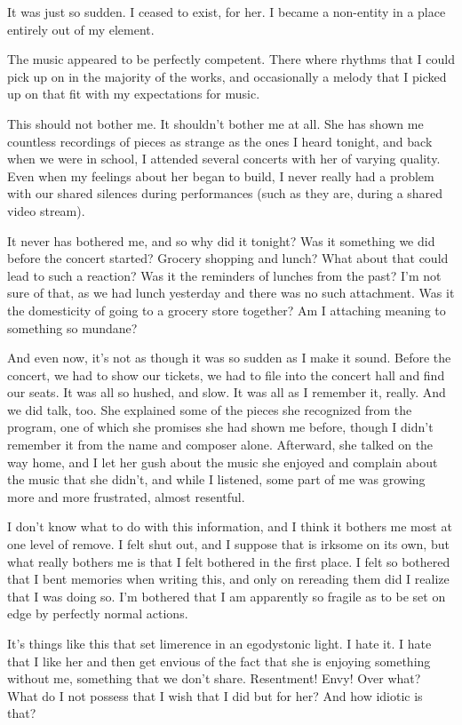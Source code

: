 It was just so sudden. I ceased to exist, for her. I became a non-entity in a place entirely out of my element.

The music appeared to be perfectly competent. There where rhythms that I could pick up on in the majority of the works, and occasionally a melody that I picked up on that fit with my expectations for music.

This should not bother me. It shouldn't bother me at all. She has shown me countless recordings of pieces as strange as the ones I heard tonight, and back when we were in school, I attended several concerts with her of varying quality. Even when my feelings about her began to build, I never really had a problem with our shared silences during performances (such as they are, during a shared video stream).

It never has bothered me, and so why did it tonight? Was it something we did before the concert started? Grocery shopping and lunch? What about that could lead to such a reaction? Was it the reminders of lunches from the past? I'm not sure of that, as we had lunch yesterday and there was no such attachment. Was it the domesticity of going to a grocery store together? Am I attaching meaning to something so mundane?

And even now, it's not as though it was so sudden as I make it sound. Before the concert, we had to show our tickets, we had to file into the concert hall and find our seats. It was all so hushed, and slow. It was all as I remember it, really. And we did talk, too. She explained some of the pieces she recognized from the program, one of which she promises she had shown me before, though I didn't remember it from the name and composer alone. Afterward, she talked on the way home, and I let her gush about the music she enjoyed and complain about the music that she didn't, and while I listened, some part of me was growing more and more frustrated, almost resentful.

I don't know what to do with this information, and I think it bothers me most at one level of remove. I felt shut out, and I suppose that is irksome on its own, but what really bothers me is that I felt bothered in the first place. I felt so bothered that I bent memories when writing this, and only on rereading them did I realize that I was doing so. I'm bothered that I am apparently so fragile as to be set on edge by perfectly normal actions.

It's things like this that set limerence in an egodystonic light. I hate it. I hate that I like her and then get envious of the fact that she is enjoying something without me, something that we don't share. Resentment! Envy! Over what? What do I not possess that I wish that I did but for her? And how idiotic is that?

